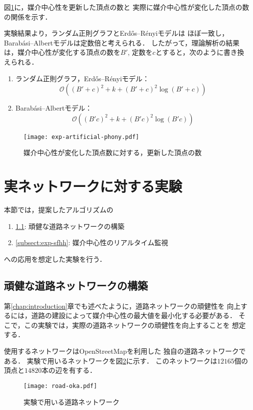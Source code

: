 図\ref{fig:exp-artificial-phony}に，媒介中心性を更新した頂点の数と
実際に媒介中心性が変化した頂点の数の関係を示す．

実験結果より，ランダム正則グラフとErd\H{o}s--R\'{e}nyiモデルは
ほぼ一致し，Barab\'{a}si--Albertモデルは定数倍と考えられる．
したがって，理論解析の結果は，媒介中心性が変化する頂点の数を$B'$,
定数を$c$とすると，次のように書き換えられる．
\begin{enumerate}
\item[] ランダム正則グラフ，Erd\H{o}s--R\'{e}nyiモデル：
  \[ \mathcal{O}((B'+c)^2+k+(B'+c)^2\log(B'+c)) \]
\item[] Barab\'{a}si--Albertモデル：
  \[ \mathcal{O}((B'c)^2+k+(B'c)^2\log(B'c)) \]
\end{enumerate}

\begin{figure}[tb]
  \centering
  \texttt{[image: exp-artificial-phony.pdf]}
  \caption{媒介中心性が変化した頂点数に対する，更新した頂点の数}
  \label{fig:exp-artificial-phony}
\end{figure}

\section{実ネットワークに対する実験}
\label{sect:exp-realnet}

本節では，提案したアルゴリズムの
\begin{enumerate}
\item[]\ref{subsect:exp-road}: 頑健な道路ネットワークの構築
\item[]\ref{subsect:exp-sfhh}: 媒介中心性のリアルタイム監視
\end{enumerate}
への応用を想定した実験を行う．

\subsection{頑健な道路ネットワークの構築}
\label{subsect:exp-road}

第\ref{chap:introduction}章でも述べたように，道路ネットワークの頑健性を
向上するには，道路の建設によって媒介中心性の最大値を最小化する必要がある．
そこで，この実験では，実際の道路ネットワークの頑健性を向上することを
想定する．

使用するネットワークはOpenStreetMap\cite{OpenStreetMap}を利用した
独自の道路ネットワークである．
実験で用いるネットワークを図\ref{fig:road-okayama}に示す．
このネットワークは$12165$個の頂点と$14820$本の辺を有する．
\begin{figure}[tb]
  \centering
  \texttt{[image: road-oka.pdf]}
  \caption{実験で用いる道路ネットワーク}
  \label{fig:road-okayama}
\end{figure}


